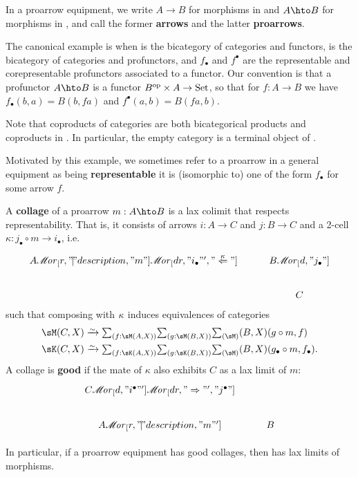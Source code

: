 \documentclass{amsart}
\let\To\Rightarrow
\def\ar#1{\mathscr{M}\!\mathit{or}_{#1}}
\def\rep#1{{#1}_\bullet}
\def\corep#1{{#1}^\bullet}
\begin{document}
In a proarrow equipment, we write $A\to B$ for morphisms in \sK and $A\hto B$ for morphisms in \sM, and call the former \textbf{arrows} and the latter \textbf{proarrows}.

\begin{eg}
  The canonical example is when \sK is the bicategory \cCat of categories and functors, \sM is the bicategory \cProf of categories and profunctors, and $\rep f$ and $\corep f$ are the representable and corepresentable profunctors associated to a functor.
  Our convention is that a profunctor $A\hto B$ is a functor $B^{\mathrm{op}}\times A\to\mathrm{Set}$, so that for $f:A\to B$ we have $\rep f(b,a) = B(b,fa)$ and $\corep f(a,b) = B(fa,b)$.

  Note that coproducts of categories are both bicategorical products and coproducts in \cProf.
  In particular, the empty category is a terminal object of \cProf.
\end{eg}

Motivated by this example, we sometimes refer to a proarrow in a general equipment as being \textbf{representable} it is (isomorphic to) one of the form $\rep f$ for some arrow $f$.

\begin{defn}
  A \textbf{collage} of a proarrow $m:A\hto B$ is a lax colimit that respects representability.
  That is, it consists of arrows $i:A\to C$ and $j:B\to C$ and a 2-cell $\kappa:\rep j \circ m \to \rep i$, i.e.\
  \[
  \begin{tikzcd}
    A \ar[r,"\mathclap{|}" description,"m"] \ar[dr,"\rep i"',"\overset\kappa\Leftarrow"] & B \ar[d,"\rep j"] \\ & C
  \end{tikzcd}
  \]
  such that composing with $\kappa$ induces equivalences of categories
  \begin{align*}
    \sM(C,X) &\toiso \tsm{f:\sM(A,X)}{g:\sM(B,X)} \sM(B,X)(g\circ m,f)\\
    \sK(C,X) &\toiso \tsm{f:\sK(A,X)}{g:\sK(B,X)} \sM(B,X)(\rep g\circ m,\rep f).
  \end{align*}
  A collage is \textbf{good} if the mate of $\kappa$ also exhibits $C$ as a lax limit of $m$:
  \[
  \begin{tikzcd}
    C \ar[d,"\corep i"'] \ar[dr,"\To"',"\corep j"] \\ A \ar[r,"\mathclap{|}" description,"m"'] & B
  \end{tikzcd}
  \]
\end{defn}

In particular, if a proarrow equipment has good collages, then \sM has lax limits of morphisms.
\end{document}
